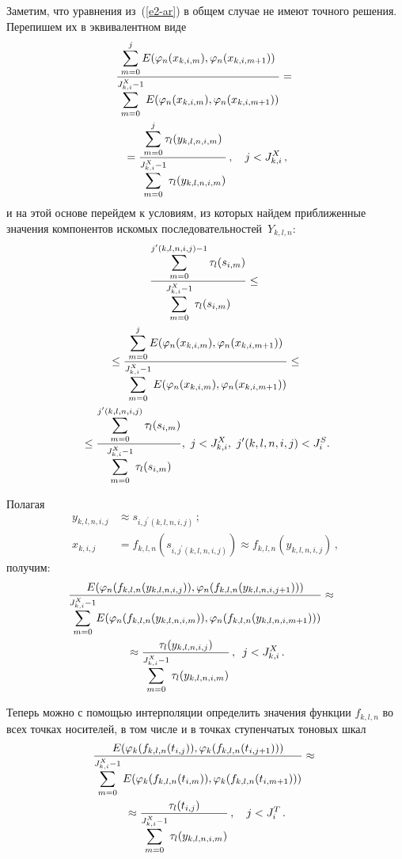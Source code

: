 \begin{multicols}{2}
  Заметим, что уравнения из~(\ref{e2-ar}) в общем случае не имеют точного 
решения. Перепишем их в эквивалентном виде
  \begin{multline*}
  \displaystyle\frac{\displaystyle \sum\limits_{m=0}^j E(\varphi_n(x_{k,i,m}),\varphi_n(x_{k,i,m+1}))\mathstrut}{\displaystyle \sum\limits_{m=0}^{J^X_{k,i}-1} 
E(\varphi_n(x_{k,i,m}),\varphi_n(x_{k,i,m+1}))\mathstrut} = {}\\
{}=
  \displaystyle\frac{\displaystyle \sum\limits_{m=0}^j \tau_l(y_{k,l,n,i,m})\mathstrut}{\displaystyle \sum\limits_{m=0}^{J_{k,i}^X-1} \tau_l(y_{k,l,n,i,m})\mathstrut}\,,\quad j< 
J_{k,i}^X\,,
  \end{multline*}
и на этой основе перейдем к условиям, из которых найдем приближенные 
значения компонентов искомых последовательностей~$Y_{k,l,n}$:
\begin{multline*}
\displaystyle\frac{\displaystyle \sum\limits_{m=0}^{j^\prime(k,l,n,i,j)-1} \tau_l(s_{i,m})\mathstrut}{\displaystyle \sum\limits_{m=0}^{J^X_{k,i}-1}\tau_l(s_{i,m})\mathstrut}\leq{}\\
{}\leq
\displaystyle\frac{\displaystyle \sum\limits_{m=0}^j E(\varphi_n(x_{k,i,m}),\varphi_n(x_{k,i,m+1}))\mathstrut}{\displaystyle \sum\limits_{m=0}^{J^X_{k,i}-1} E 
(\varphi_n(x_{k,i,m}),\varphi_n(x_{k,i,m+1}))\mathstrut}\leq{}\\
{}\leq
\displaystyle\frac{\displaystyle \sum\limits_{m=0}^{j^\prime(k,l,n,i,j)}\tau_l(s_{i,m})\mathstrut}{\displaystyle \sum\limits_{m=0}^{J^X_{k,i}-1}\tau_l(s_{i,m})\mathstrut},\
j<  J^X_{k,i},\  j^\prime(k,l,n,i,j)<J_i^S.
\end{multline*}
  
  Полагая
  \begin{align*}
  y_{k,l,n,i,j}&\approx s_{i,j^\prime(k,l,n,i,j)}\,;\\
  x_{k,i,j} &=f_{k,l,n}\left(s_{i,j^\prime(k,l,n,i,j)}\right)\approx
  f_{k,l,n}(y_{k,l,n,i,j})\,,
  \end{align*}
получим:
{\small\begin{multline*}
\hspace*{-5.79pt}\displaystyle\frac{\displaystyle E(\varphi_n(f_{k,l,n}(y_{k,l,n,i,j})),\varphi_n(f_{k,l,n}(y_{k,l,n,i,j+1})))\mathstrut}{\displaystyle \sum\limits_{m=0}^{J^X_{k,i}-1} 
\!E(\varphi_n(f_{k,l,n}(y_{k,l,n,i,m})),\varphi_n(f_{k,l,n}(y_{k,l,n,i,m+1})))\mathstrut} 
\approx{}\\
{}\approx
\displaystyle\frac{\displaystyle \tau_l(y_{k,l,n,i,j})\mathstrut}{\displaystyle \sum\limits_{m=0}^{J^X_{k,i}-1}\tau_l(y_{k,l,n,i,m})\mathstrut}\,,\enskip
j<J^X_{k,i}\,.
\end{multline*}}
  
  Теперь можно с помощью интерполяции определить значения функции 
$f_{k,l,n}$ во всех точках носителей, в том числе и в точках ступенчатых тоновых 
шкал
  \begin{multline*}
  \displaystyle\frac{\displaystyle E(\varphi_k(f_{k,l,n}(t_{i,j})),\varphi_k(f_{k,l,n}(t_{i,j+1})))\mathstrut}{\displaystyle \sum\limits_{m=0}^{J^X_{k,i}-1} E (\varphi_k(f_{k,l,n}(t_{i,m})),\varphi_k 
(f_{k,l,n}(t_{i,m+1})))\mathstrut}
  \approx{}\\
  {}\approx
  \displaystyle\frac{\displaystyle \tau_l(t_{i,j})\mathstrut}{\displaystyle \sum\limits_{m=0}^{J^X_{k,i}-1} \tau_l (y_{k,l,n,i,m})\mathstrut}\,,\quad 
  j<J_i^T\,.
  \end{multline*}
  

\end{multicols}
